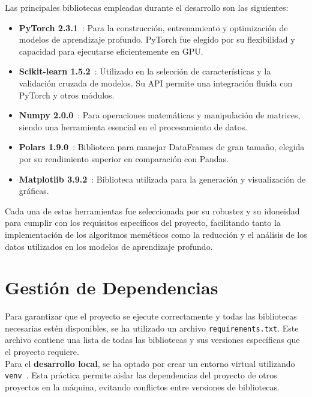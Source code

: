 Las principales bibliotecas empleadas durante el desarrollo son las siguientes:
\begin{itemize}
    \item \textbf{PyTorch 2.3.1}~\cite{ketkar_introduction_2021, noauthor_torchcuda_nodate}: Para la construcción,
          entrenamiento y optimización de modelos de aprendizaje profundo.
          PyTorch fue elegido por su flexibilidad y capacidad para ejecutarse eficientemente en GPU\@.
    \item \textbf{Scikit-learn 1.5.2}~\cite{kramer_scikit-learn_2016}: Utilizado en la selección de características y
          la validación cruzada de modelos.
          Su API permite una integración fluida con PyTorch y otros módulos.
    \item \textbf{Numpy 2.0.0}~\cite{noauthor_numpy_nodate}: Para operaciones matemáticas y manipulación de matrices,
          siendo una herramienta esencial en el procesamiento de datos.
    \item \textbf{Polars 1.9.0}~\cite{noauthor_polars_nodate}: Biblioteca para manejar DataFrames de gran tamaño,
          elegida por su rendimiento superior en comparación con Pandas.
    \item \textbf{Matplotlib 3.9.2}~\cite{noauthor_matplotlib_nodate}: Biblioteca utilizada para la generación y
          visualización de gráficas.
\end{itemize}

Cada una de estas herramientas fue seleccionada por su robustez y su idoneidad para cumplir con los requisitos
específicos del proyecto, facilitando tanto la implementación de los algoritmos meméticos como la reducción y el
análisis de los datos utilizados en los modelos de aprendizaje profundo. \\[6pt]

\section{Gestión de Dependencias}\label{sec:gestion-de-dependencias}
Para garantizar que el proyecto se ejecute correctamente y todas las bibliotecas necesarias estén disponibles, se ha
utilizado un archivo \texttt{requirements.txt}.
Este archivo contiene una lista de todas las bibliotecas y sus versiones específicas que el proyecto requiere. \\[6pt]

Para el \textbf{desarrollo local}, se ha optado por crear un entorno virtual utilizando
\texttt{venv}~\cite{noauthor_creation_nodate}.
Esta práctica permite aislar las dependencias del proyecto de otros proyectos en la máquina, evitando conflictos entre
versiones de bibliotecas. \\[6pt]


